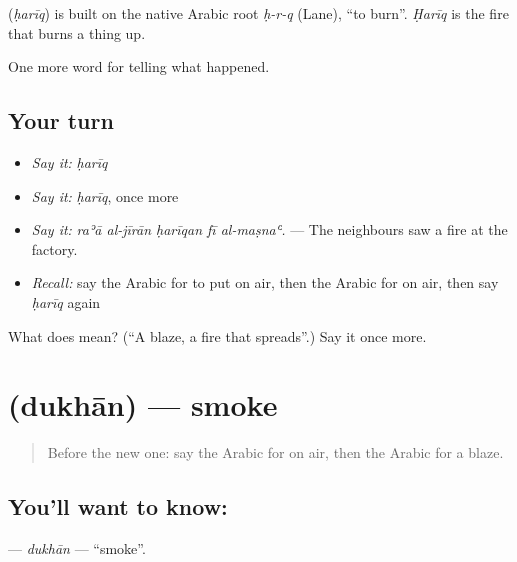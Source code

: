 \begin{cousinweb}
\textbf{} (\emph{ḥarīq}) is built on the native Arabic root \emph{ḥ-r-q} (Lane), \textquotedblleft{}to burn\textquotedblright{}. \emph{Ḥarīq} is the fire that burns a thing up.
\end{cousinweb}

\begin{grammarlens}[title={What you've built}]
One more word for telling what happened.
\end{grammarlens}

\subsection*{Your turn}
\begin{itemize}
\raggedright
  \item \emph{Say it:} \emph{ḥarīq}
  \item \emph{Say it:} \emph{ḥarīq}, once more
  \item \emph{Say it:} \emph{raʾā al-jīrān ḥarīqan fī al-maṣnaʿ.} — The neighbours saw a fire at the factory.
  \item \emph{Recall:} say the Arabic for to put on air, then the Arabic for on air, then say \emph{ḥarīq} again
\end{itemize}

\begin{tcolorbox}[breakable,colback=teal!4,colframe=teal!35!black,title={Before you move on}]
What does  mean? (\textquotedblleft{}A blaze, a fire that spreads\textquotedblright{}.) Say it once more.
\end{tcolorbox}
\section[\texorpdfstring{\ar{دخان} (dukhān)}{دخان (dukhān)}]{ (dukhān) — smoke}

\label{lesson:AR-C298-dukhan}



\begin{quote}
Before the new one: say the Arabic for on air, then the Arabic for a blaze.
\end{quote}

\subsection*{You'll want to know: }
\textbf{} — \emph{dukhān} — \textquotedblleft{}smoke\textquotedblright{}.

